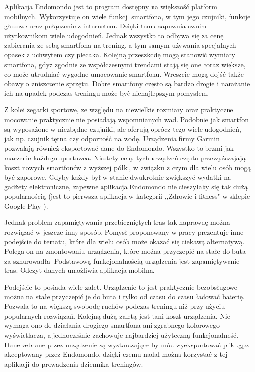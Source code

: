 \documentclass[a4paper,twoside,titlepage,openright]{book}
\begin{document}
Aplikacja Endomondo \cite{endomondo} jest to program dostępny na większość platform mobilnych. Wykorzystuje on wiele funkcji smartfona, w tym jego czujniki, funkcje głosowe oraz połączenie z internetem. Dzięki temu zapewnia swoim użytkownikom wiele udogodnień. Jednak wszystko to odbywa się za cenę zabierania ze sobą smartfona na trening, a tym samym używania specjalnych opasek z uchwytem czy plecaka. Kolejną przeszkodę mogą stanowić wymiary smartfona, gdyż zgodnie ze współczesnymi trendami stają się one coraz większe, co może utrudniać wygodne umocowanie smartfonu. Wreszcie mogą dojść także obawy o zniszczenie sprzętu. Dobre smartfony często są bardzo drogie i narażanie ich na upadek podczas treningu może być nienajlepszym pomysłem.

Z kolei zegarki sportowe, ze względu na niewielkie rozmiary oraz praktyczne mocowanie praktycznie nie posiadają wspomnianych wad. Podobnie jak smartfon są wyposażone w niezbędne czujniki, ale oferują oprócz tego wiele udogodnień, jak np. czujnik tętna czy odporność na wodę. Urządzenia firmy Garmin \cite{garmin} pozwalają również eksportować dane do Endomondo. Wszystko to brzmi jak marzenie każdego sportowca. Niestety ceny tych urządzeń często przewyższajają koszt nowych smartfonów z wyższej półki, w związku z czym dla wielu osób mogą być zaporowe. Gdyby każdy był w stanie dwukrotnie zwiększyć wydatki na gadżety elektroniczne, zapewne aplikacja Endomondo nie cieszyłaby się tak dużą popularnością (jest to pierwsza aplikacja w kategorii ,,Zdrowie i fitness" w sklepie Google Play \cite{googlePlay}).

Jednak problem zapamiętywania przebiegniętych tras tak naprawdę można rozwiązać w jeszcze inny sposób. Pomysł proponowany w pracy prezentuje inne podejście do tematu, które dla wielu osób może okazać się ciekawą alternatywą. Polega on na zmontowaniu urządzenia, które można przyczepić na stałe do buta za sznurowadła. Podstawową funkcjonalnością urządzenia jest zapamiętywanie tras. Odczyt danych umożliwia aplikacja mobilna. 

Podejście to posiada wiele zalet. Urządzenie to jest praktycznie bezobsługowe -- można na stałe przyczepić je do buta i tylko od czasu do czasu ładować baterię. Pozwala to na większą swobodę ruchów podczas treningu niż przy użyciu popularnych rozwiązań. Kolejną dużą zaletą jest tani koszt urządzenia. Nie wymaga ono do działania drogiego smartfona ani zgrabnego kolorowego wyświetlacza, a jednocześnie zachowuje najbardziej użyteczną funkcjonalność. Dane zebrane przez urządzenie są wystarczające by móc wyeksportować plik .gpx akceptowany przez Endomondo, dzięki czemu nadal można korzystać z tej aplikacji do prowadzenia dziennika treningów.
\end{document}

